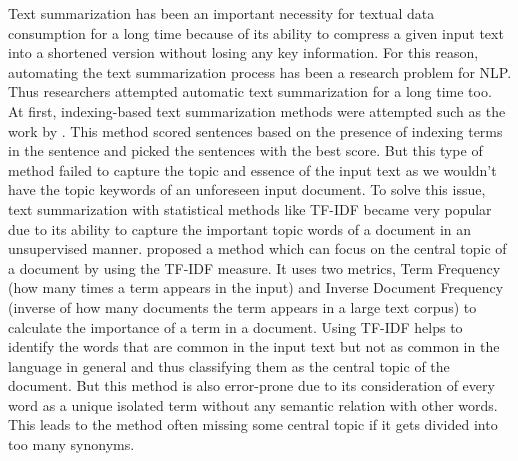 Text summarization has been an important necessity for textual data consumption for a long time because of its ability to compress a given input text into a shortened version without losing any key information. For this reason, automating the text summarization process has been a research problem for NLP. Thus researchers attempted automatic text summarization for a long time too. At first, indexing-based text summarization methods were attempted such as the work by \citeauthor{Baxendale_1958_firstsummarization} \cite{Baxendale_1958_firstsummarization}. This method scored sentences based on the presence of indexing terms in the sentence and picked the sentences with the best score. But this type of method failed to capture the topic and essence of the input text as we wouldn't have the topic keywords of an unforeseen input document. To solve this issue, text summarization with statistical methods like TF-IDF became very popular due to its ability to capture the important topic words of a document in an unsupervised manner. \citeauthor{edmundson_1969_earlysum} \cite{edmundson_1969_earlysum} proposed a method which can focus on the central topic of a document by using the TF-IDF measure. It uses two metrics, Term Frequency (how many times a term appears in the input) and Inverse Document Frequency (inverse of how many documents the term appears in a large text corpus) to calculate the importance of a term in a document. Using TF-IDF helps to identify the words that are common in the input text but not as common in the language in general and thus classifying them as the central topic of the document. But this method is also error-prone due to its consideration of every word as a unique isolated term without any semantic relation with other words. This leads to the method often missing some central topic if it gets divided into too many synonyms.\\ 


